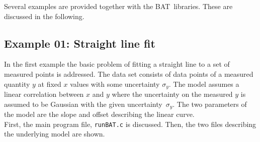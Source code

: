 \documentclass[11pt, a4paper]{article}
\newcommand{\BAT}{{\sc BAT}}
\begin{document}
Several examples are provided together with the \BAT\ libraries. These
are discussed in the following. 


\subsection{Example 01: Straight line fit} 

In the first example the basic problem of fitting a straight line to a
set of measured points is addressed. The data set consists of data
points of a measured quantity $y$ at fixed $x$ values with some
uncertainty $\sigma_{y}$. The model assumes a linear correlation
between $x$ and $y$ where the uncertainty on the measured $y$ is
assumed to be Gaussian with the given uncertainty~$\sigma_{y}$. The
two parameters of the model are the slope and offset describing the
linear curve. \\

\noindent 
First, the main program file, \verb|runBAT.c| is discussed. Then, the
two files describing the underlying model are shown. \\ 

\pagebreak 
\end{document}
